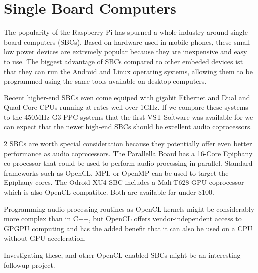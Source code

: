 \section{Single Board Computers}

The popularity of the Raspberry Pi has spurned a whole industry around single-board computers (SBCs). Based on hardware used in mobile phones, these small low power devices are extremely popular because they are inexpensive and easy to use. The biggest advantage of SBCs compared to other embeded devices ist that they can run the Android and Linux operating systems, allowing them to be programmed using the same tools available on desktop computers.

Recent higher-end SBCs even come equiped with gigabit Ethernet and Dual and Quad Core CPUs running at rates well over 1GHz. If we compare these systems to the 450MHz G3 PPC systems that the first VST Software was available for we can expect that the newer high-end SBCs should be excellent audio coprocessors.

2 SBCs are worth special consideration because they potentially offer even better performance as audio coprocessors. The Parallella Board has a 16-Core Epiphany co-processor that could be used to perform audio processing in parallel. Standard frameworks such as OpenCL, MPI, or OpenMP can be used to target the Epiphany cores. The Odroid-XU4 SBC includes a Mali-T628 GPU coprocessor which is also OpenCL compatible. Both are available for under \$100.

Programming audio processing routines as OpenCL kernels might be considerably more complex than in C++, but OpenCL offers vendor-independent access to GPGPU computing and has the added benefit that it can also be used on a CPU without GPU acceleration\cite{vst-gpu}.

Investigating these, and other OpenCL enabled SBCs might be an interesting followup project.